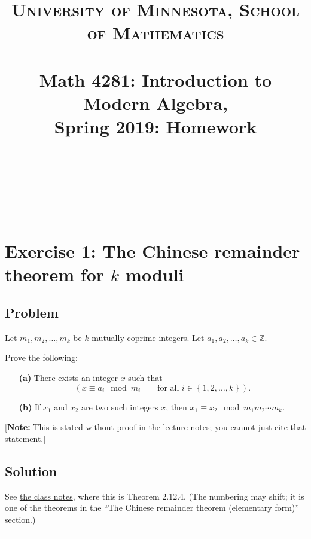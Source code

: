 \documentclass[paper=a4, fontsize=12pt]{scrartcl} %
\title{	
\normalfont \normalsize 
\textsc{University of Minnesota, School of Mathematics} \\ [25pt] %
\horrule{0.5pt} \\[0.4cm] %
\huge Math 4281: Introduction to Modern Algebra, \\
Spring 2019:
Homework \psetnumber\\%
\horrule{2pt} \\[0.5cm] %
}
\author{\myname}
\newcommand{\ZZ}{\mathbb{Z}} %
\newcommand{\set}[1]{\left\{ #1 \right\}}
\newcommand{\tup}[1]{\left( #1 \right)}
\newcommand{\horrule}[1]{\rule{\linewidth}{#1}} %
\theoremstyle{plainsl}
\theoremstyle{definition}
\theoremstyle{remark}
\begin{document}
\maketitle %

\horrule{0.3pt} \\[0.4cm]

\section{Exercise 1: The Chinese remainder theorem for $k$ moduli}

\subsection{Problem}

Let $m_1, m_2, \ldots, m_k$ be $k$ mutually coprime integers.
Let $a_1, a_2, \ldots, a_k \in \ZZ$.

Prove the following:

\begin{enumerate}

\item[\textbf{(a)}]
There exists an integer $x$ such that
\[
\tup{ x \equiv a_i \mod m_i \qquad \text{for all } i \in \set{1, 2, \ldots, k} } .
\]

\item[\textbf{(b)}]
If $x_1$ and $x_2$ are two such integers $x$, then
$x_1 \equiv x_2 \mod m_1 m_2 \cdots m_k$.

\end{enumerate}

[\textbf{Note:} This is stated without proof in the lecture notes;
you cannot just cite that statement.]

\subsection{Solution}

See
\href{http://www-users.math.umn.edu/~dgrinber/19s/notes.pdf}{the class notes},
where this is Theorem 2.12.4. (The numbering may shift; it is one of the
theorems in the
``The Chinese remainder theorem (elementary form)''
section.)

\horrule{0.3pt} \\[0.4cm]
\end{document}
